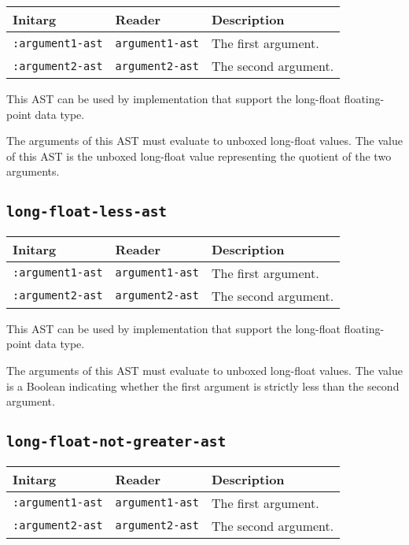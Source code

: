 \begin{tabular}{|l|l|l|}
\hline
Initarg & Reader & Description\\
\hline\hline
\texttt{:argument1-ast} & \texttt{argument1-ast} & The first argument.\\
\hline
\texttt{:argument2-ast} & \texttt{argument2-ast} & The second argument.\\
\hline
\end{tabular}

This AST can be used by implementation that support the long-float
floating-point data type.  

The arguments of this AST must evaluate to unboxed long-float
values.  The value of this AST is the unboxed long-float value
representing the quotient of the two arguments.

\subsection{\texttt{long-float-less-ast}}
\label{sec-ast-long-float-less}

\begin{tabular}{|l|l|l|}
\hline
Initarg & Reader & Description\\
\hline\hline
\texttt{:argument1-ast} & \texttt{argument1-ast} & The first argument.\\
\hline
\texttt{:argument2-ast} & \texttt{argument2-ast} & The second argument.\\
\hline
\end{tabular}

This AST can be used by implementation that support the long-float
floating-point data type.  

The arguments of this AST must evaluate to unboxed long-float
values.  The value is a Boolean indicating whether the first argument
is strictly less than the second argument.

\subsection{\texttt{long-float-not-greater-ast}}
\label{sec-ast-long-float-not-greater}

\begin{tabular}{|l|l|l|}
\hline
Initarg & Reader & Description\\
\hline\hline
\texttt{:argument1-ast} & \texttt{argument1-ast} & The first argument.\\
\hline
\texttt{:argument2-ast} & \texttt{argument2-ast} & The second argument.\\
\hline
\end{tabular}


